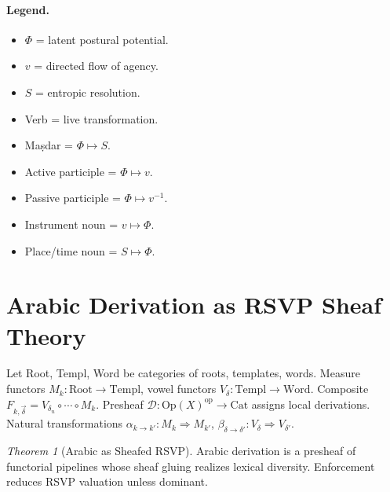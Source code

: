 \documentclass[12pt]{article}
\theoremstyle{remark}
\newtheorem*{theorem*}{Theorem}
\begin{document}
\paragraph{Legend.}
\begin{itemize}
  \item $\Phi$ = latent postural potential.
  \item $v$ = directed flow of agency.
  \item $S$ = entropic resolution.
  \item Verb = live transformation.
  \item Maṣdar = $\Phi \mapsto S$.
  \item Active participle = $\Phi \mapsto v$.
  \item Passive participle = $\Phi \mapsto v^{-1}$.
  \item Instrument noun = $v \mapsto \Phi$.
  \item Place/time noun = $S \mapsto \Phi$.
\end{itemize}

\section{Arabic Derivation as RSVP Sheaf Theory}
\label{app:sheaf}
Let Root, Templ, Word be categories of roots, templates, words. Measure functors $M_k: \mathrm{Root} \to \mathrm{Templ}$, vowel functors $V_\delta: \mathrm{Templ} \to \mathrm{Word}$. Composite $F_{k,\vec{\delta}} = V_{\delta_n} \circ \cdots \circ M_k$. Presheaf $\mathcal{D}: \mathrm{Op}(X)^{\mathrm{op}} \to \mathrm{Cat}$ assigns local derivations. Natural transformations $\alpha_{k\to k'}: M_k \Rightarrow M_{k'}$, $\beta_{\delta\to\delta'}: V_\delta \Rightarrow V_{\delta'}$.


\begin{theorem*}[Arabic as Sheafed RSVP]
Arabic derivation is a presheaf of functorial pipelines whose sheaf gluing realizes lexical diversity. Enforcement reduces RSVP valuation unless dominant.
\end{theorem*}
\end{document}
